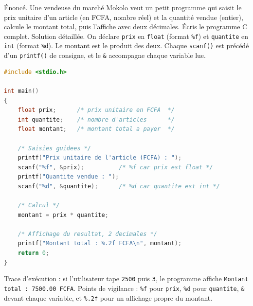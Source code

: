 \documentclass[11pt]{article}
\begin{document}
\begin{exoresolu}
Énoncé. Une vendeuse du marché Mokolo veut un petit programme qui saisit le prix unitaire d'un article (en FCFA, nombre réel) et la quantité vendue (entier), calcule le montant total, puis l'affiche avec deux décimales. Écris le programme C complet.
\tcblower
Solution détaillée. On déclare \texttt{prix} en \texttt{float} (format \texttt{\%f}) et \texttt{quantite} en \texttt{int} (format \texttt{\%d}). Le montant est le produit des deux. Chaque \texttt{scanf()} est précédé d'un \texttt{printf()} de consigne, et le \texttt{\&} accompagne chaque variable lue.
\begin{lstlisting}[language=C]
#include <stdio.h>

int main()
{
    float prix;      /* prix unitaire en FCFA  */
    int quantite;    /* nombre d'articles      */
    float montant;   /* montant total a payer  */

    /* Saisies guidees */
    printf("Prix unitaire de l'article (FCFA) : ");
    scanf("%f", &prix);          /* %f car prix est float */
    printf("Quantite vendue : ");
    scanf("%d", &quantite);      /* %d car quantite est int */

    /* Calcul */
    montant = prix * quantite;

    /* Affichage du resultat, 2 decimales */
    printf("Montant total : %.2f FCFA\n", montant);
    return 0;
}
\end{lstlisting}
Trace d'exécution : si l'utilisateur tape \texttt{2500} puis \texttt{3}, le programme affiche \texttt{Montant total : 7500.00 FCFA}. Points de vigilance : \texttt{\%f} pour \texttt{prix}, \texttt{\%d} pour \texttt{quantite}, \texttt{\&} devant chaque variable, et \texttt{\%.2f} pour un affichage propre du montant.
\end{exoresolu}
\end{document}

